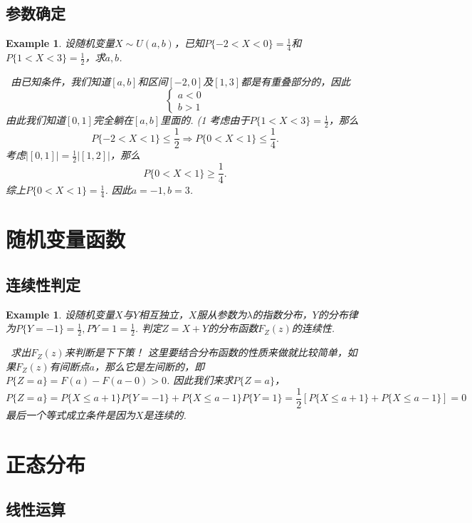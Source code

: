 \documentclass{article}
\newtheorem{example}[theorem]{Example}
\newcommand{\hints}{{\color{blue} \text{hints}}}
\begin{document}
\subsection{参数确定}

\begin{example}
\rm 设随机变量$X \sim U(a,b)$，已知$P\{-2< X < 0\} = \frac{1}{4}$和$P\{1<X<3\} = \frac{1}{2}$，求$a,b$. 

\hints\ 由已知条件，我们知道$[a,b]$和区间$[-2,0]$及$[1,3]$都是有重叠部分的，因此
$$
\left\{
\begin{array}{ll}
a < 0 \\
b > 1  
\end{array} \right.
$$ 
由此我们知道$[0,1]$完全躺在$[a,b]$里面的. (1 考虑由于$P\{1< X < 3\} =\frac{1}{2}$，那么
$$
P\{-2 < X < 1\} \leq \frac{1}{2}  \Rightarrow  P\{0 < X < 1\} \leq \frac{1}{4}.
$$
考虑$|[0,1]| = \frac{1}{2}|[1,2]|$，那么
$$
P\{0 < X < 1\} \geq \frac{1}{4}. 
$$
综上$P\{0 < X < 1 \} = \frac{1}{4}$. 因此$a = -1, b=3$. 
\end{example}


\section{随机变量函数}

\subsection{连续性判定}

\begin{example}
\rm 设随机变量$X$与$Y$相互独立，$X$服从参数为$\lambda$的指数分布，$Y$的分布律为$P\{Y=-1\}=\frac{1}{2},P{Y=1}=\frac{1}{2}$. 判定$Z=X+Y$的分布函数$F_Z(z)$的连续性.

\hints\ 求出$F_Z(z)$来判断是下下策！ 这里要结合分布函数的性质来做就比较简单，如果$F_Z(z)$有间断点$a$，那么它是左间断的，即$P\{Z=a\} = F(a) - F(a-0) > 0$. 因此我们来求$P\{Z=a\}$，
$$
P\{Z=a\} = P\{X \leq a+1\}P\{Y = -1\} + P\{X \leq a-1\}P\{Y = 1\} = \frac{1}{2}\left[ P\{X \leq a+1\} + P\{X \leq a-1\} \right] = 0    
$$
最后一个等式成立条件是因为$X$是连续的. 
\end{example}

\newpage
\section{正态分布}


\subsection{线性运算}
\end{document}
